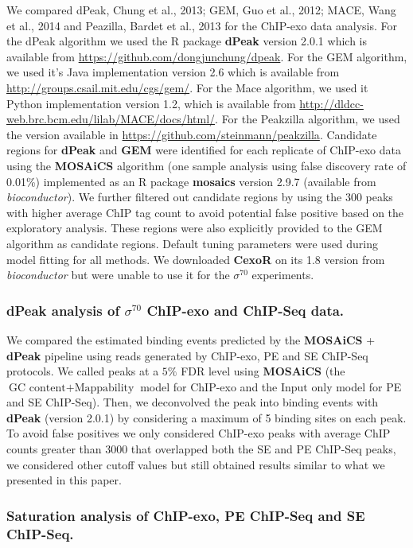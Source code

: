 \documentclass{bmcart}\usepackage[]{graphicx}\usepackage[]{color}
\newcommand{\sig}{\sigma^{70}}
\begin{document}
We compared dPeak, Chung et al., 2013; GEM, Guo et al., 2012; MACE,
Wang et al., 2014 and Peazilla, Bardet et al., 2013 for the ChIP-exo
data analysis. For the dPeak algorithm we used the R package
\textbf{dPeak} version 2.0.1 which is available from
\url{https://github.com/dongjunchung/dpeak}. For the GEM algorithm, we
used it's Java implementation version 2.6 which is available from
\url{http://groups.csail.mit.edu/cgs/gem/}. For the Mace algorithm, we
used it Python implementation version 1.2, which is available from
\url{http://dldcc-web.brc.bcm.edu/lilab/MACE/docs/html/}. For the
Peakzilla algorithm, we used the version available in
\url{https://github.com/steinmann/peakzilla}. Candidate regions for
\textbf{dPeak} and \textbf{GEM} were identified for each replicate of
ChIP-exo data using the \textbf{MOSAiCS} algorithm \cite{mosaics} (one
sample analysis using false discovery rate of 0.01\%)
implemented as an R package \textbf{mosaics} version 2.9.7 (available
from \emph{bioconductor}). We further filtered out candidate regions
by using the 300 peaks with higher average ChIP tag count to
avoid potential false positive based on the exploratory
analysis. These regions were also explicitly provided to the GEM
algorithm as candidate regions. Default tuning parameters were used
during model fitting for all methods. We downloaded \textbf{CexoR}
\cite{cexor} on its 1.8 version from \emph{bioconductor} but were
unable to use it for the $\sig$ experiments.

\subsubsection*{dPeak analysis of $\sig$ ChIP-exo and ChIP-Seq data.}

We compared the estimated binding events predicted by the
\textbf{MOSAiCS} + \textbf{dPeak} pipeline using reads generated by
ChIP-exo, PE and SE ChIP-Seq protocols. We called peaks at a $5\%$ FDR
level using \textbf{MOSAiCS} (the $\mbox{GC content} +
\mbox{Mappability}$ model for ChIP-exo and the $\mbox{Input only}$
model for PE and SE ChIP-Seq). Then, we deconvolved the peak into
binding events with \textbf{dPeak} (version 2.0.1) by considering a
maximum of 5 binding sites on each peak. To avoid false positives we
only considered ChIP-exo peaks with average ChIP counts greater than
3000 that overlapped both the SE and PE ChIP-Seq peaks, we considered
other cutoff values but still obtained results similar to what we
presented in this paper.

\subsubsection*{Saturation analysis of ChIP-exo, PE ChIP-Seq and SE ChIP-Seq.}
\end{document}
